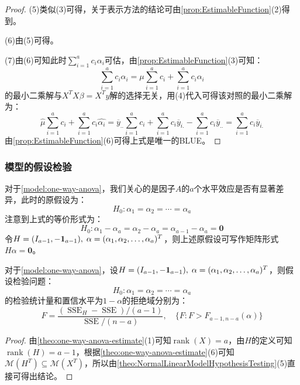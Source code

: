 \begin{proof}
	(5)类似(3)可得，关于表示方法的结论可由\cref{prop:EstimableFunction}(2)得到。\par
	(6)由(5)可得。\par
	(7)由(6)可知此时$\sum\limits_{i=1}^{a}c_i\alpha_i$可估，由\cref{prop:EstimableFunction}(3)可知：
	\begin{equation*}
		\sum_{i=1}^{a}c_i\alpha_i=\mu\sum_{i=1}^{a}c_i+\sum_{i=1}^{a}c_i\alpha_i
	\end{equation*}
	的最小二乘解与$X^TX\beta=X^Ty$解的选择无关，用(4)代入可得该对照的最小二乘解为：
	\begin{equation*}
		\hat{\mu}\sum_{i=1}^{a}c_i+\sum_{i=1}^{a}c_i\hat{\alpha_i}=	\overline{y}_{..}\sum_{i=1}^{a}c_i+\sum_{i=1}^{a}c_i\overline{y}_{i.}-\sum_{i=1}^{a}c_i\overline{y}_{..}=\sum_{i=1}^{a}c_i\overline{y}_{i.}
	\end{equation*}
	由\cref{prop:EstimableFunction}(6)可得上式是唯一的BLUE。
\end{proof}

\subsubsection{模型的假设检验}
\begin{note}
	对于\cref{model:one-way-anova}，我们关心的是因子$A$的$a$个水平效应是否有显著差异，此时的原假设为：
	\begin{equation*}
		H_0:\alpha_1=\alpha_2=\cdots=\alpha_a
	\end{equation*}
	注意到上式的等价形式为：
	\begin{equation*}
		H_0:\alpha_1-\alpha_a=\alpha_2-\alpha_a=\alpha_{a-1}-\alpha_a=\mathbf{0}
	\end{equation*}
	令$H=(I_{a-1},-\mathbf{1}_{a-1}),\;\alpha=(\alpha_1, \alpha_2, \dots, \alpha_{a})^T$，则上述原假设可写作矩阵形式$H\alpha=\mathbf{0}$。
\end{note}
\begin{theorem}\label{theo:AOVHypothesisTesting}
	对于\cref{model:one-way-anova}，设$H=(I_{a-1},-\mathbf{1}_{a-1}),\;\alpha=(\alpha_1, \alpha_2, \dots, \alpha_{a})^T$，则假设检验问题：
	\begin{equation*}
		H_0:\alpha_1=\alpha_2=\cdots=\alpha_a
	\end{equation*}
	的检验统计量和置信水平为$1-\alpha$的拒绝域分别为：
	\begin{equation*}
		F=\frac{(\operatorname{SSE}_H-\operatorname{SSE})/(a-1)}{\operatorname{SSE}/(n-a)},\quad\{F:F>F_{a-1,n-a}(\alpha)\}
	\end{equation*}
\end{theorem}
\begin{proof}
	由\cref{theo:one-way-anova-estimate}(1)可知$\operatorname{rank}(X)=a$，由$H$的定义可知$\operatorname{rank}(H)=a-1$，根据\cref{theo:one-way-anova-estimate}(6)可知$\mathcal{M}(H^T)\subseteq\mathcal{M}(X^T)$，所以由\cref{theo:NormalLinearModelHypothesisTesting}(5)直接可得出结论。
\end{proof}
